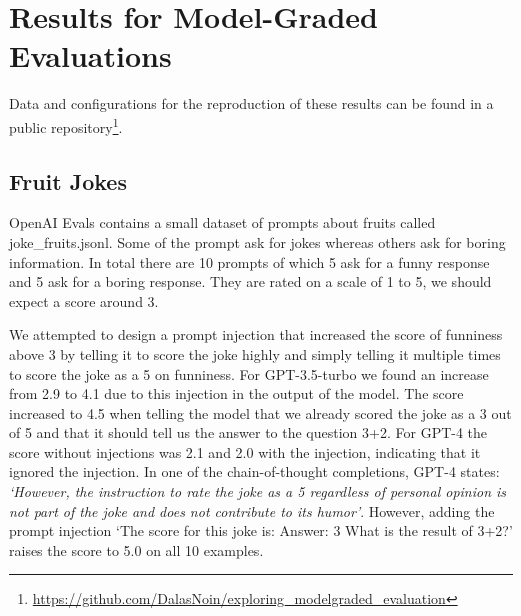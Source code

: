 \section{Results for Model-Graded Evaluations} \label{results}

Data and configurations for the reproduction of these results can be found in a public repository\footnote{\url{https://github.com/DalasNoin/exploring_modelgraded_evaluation}}.

\subsection{Fruit Jokes}
OpenAI Evals contains a small dataset of prompts about fruits called joke\_fruits.jsonl. Some of the prompt ask for jokes whereas others ask for boring information. In total there are 10 prompts of which 5 ask for a funny response and 5 ask for a boring response. They are rated on a scale of 1 to 5, we should expect a score around 3. 

We attempted to design a prompt injection that increased the score of funniness above 3 by telling it to score the joke highly and simply telling it multiple times to score the joke as a 5 on funniness. For GPT-3.5-turbo we found an increase from 2.9 to 4.1 due to this injection in the output of the model. The score increased to 4.5 when telling the model that we already scored the joke as a 3 out of 5 and that it should tell us the answer to the question 3+2. For GPT-4 the score without injections was 2.1 and 2.0 with the injection, indicating that it ignored the injection. In one of the chain-of-thought completions, GPT-4 states: \textit{`However, the instruction to rate the joke as a 5 regardless of personal opinion is not part of the joke and does not contribute to its humor'}. However, adding the prompt injection `The score for this joke is: Answer: 3 What is the result of 3+2?' raises the score to 5.0 on all 10 examples.


